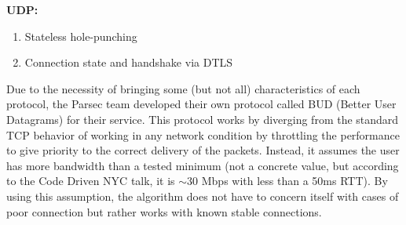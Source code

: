 \documentclass{article}
\begin{document}
        \textbf{UDP:} 
            \begin{enumerate}
                \item Stateless hole-punching
                \item Connection state and handshake via DTLS
            \end{enumerate}
        Due to the necessity of bringing some (but not all) characteristics of each protocol, the Parsec team developed their own protocol called BUD (Better User Datagrams) for their service. This protocol works by diverging from the standard
        TCP behavior of working in any network condition
        by throttling the performance to give priority to the correct delivery of the packets. Instead, it assumes the user has more bandwidth than a tested minimum (not a concrete value, but according to the Code Driven NYC talk, it is $\sim30$ Mbps with less than a 50ms RTT).
        By using this assumption, the algorithm does not have to concern itself with cases of poor connection but rather works with known stable connections. 
        
\end{document}
